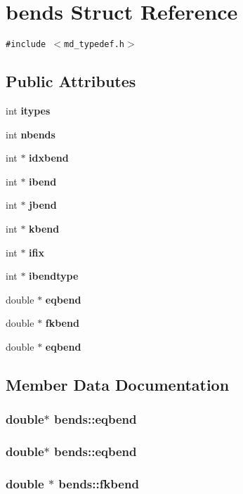 \section{bends Struct Reference}
\label{structbends}
{\tt \#include $<$md\_\-typedef.h$>$}

\subsection*{Public Attributes}
\begin{CompactItemize}
\item 
int {\bf itypes}
\item 
int {\bf nbends}
\item 
int $\ast$ {\bf idxbend}
\item 
int $\ast$ {\bf ibend}
\item 
int $\ast$ {\bf jbend}
\item 
int $\ast$ {\bf kbend}
\item 
int $\ast$ {\bf ifix}
\item 
int $\ast$ {\bf ibendtype}
\item 
double $\ast$ {\bf eqbend}
\item 
double $\ast$ {\bf fkbend}
\item 
double $\ast$ {\bf eqbend}
\end{CompactItemize}


\subsection{Member Data Documentation}
\subsubsection{\setlength{\rightskip}{0pt plus 5cm}double$\ast$ {\bf bends::eqbend}}\label{structbends_879721dcc5126df1e9495143833dfa04}


\subsubsection{\setlength{\rightskip}{0pt plus 5cm}double$\ast$ {\bf bends::eqbend}}\label{structbends_879721dcc5126df1e9495143833dfa04}


\subsubsection{\setlength{\rightskip}{0pt plus 5cm}double $\ast$ {\bf bends::fkbend}}\label{structbends_85ebc986e3deb5692280dea91e72c0f2}


